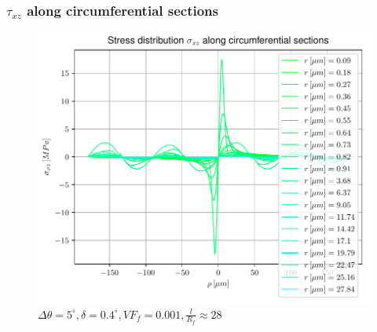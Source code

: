 \documentclass[first,firstsupp,lastsupp,handout,last,hyperref,table]{ETHclass}
\begin{document}
\begin{frame}
\frametitle{$\tau_{xz}$ along circumferential sections}
\vspace{-0.35cm}
\centering
\captionsetup[subfigure]{font=scriptsize,labelfont=scriptsize}
\begin{figure}[!h]
\centering
\includegraphics[height=0.7\textheight]{AllCircumferentialSections-S12.pdf}
 \caption{$\Delta\theta=5^{\circ},\delta=0.4^{\circ},VF_{f}=0.001,\frac{l}{R_{f}}\approx28$}
  \label{fig:allcircumS12}
\end{figure}
\end{frame}




%        
%          
\end{document}
